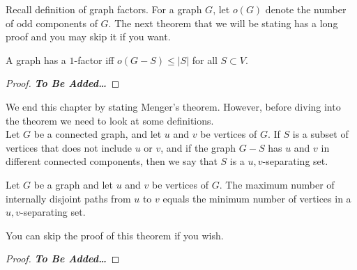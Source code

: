 \documentclass[../basic_graph_theory.tex]{subfiles}
\begin{document}
Recall definition of graph factors.  For a graph $G$, let $o(G)$ denote the number of odd components of $G$. The next theorem that we will be stating has a long proof and you may skip it if you want.
%
\begin{thm}
A graph has a $1$-factor iff $o(G-S) \leq |S|$ for all $S \subset V$.
\end{thm}
\begin{proof}
    \textbf{\textit{To Be Added\dots}}
\end{proof}
We end this chapter by stating Menger's theorem. However, before diving into the theorem we need to look at some definitions.\\
Let $G$ be a connected graph, and let $u$ and $v$ be vertices of $G$. If $S$ is a subset of vertices that does not include $u$ or $v$, and if the graph $G-S$ has $u$ and $v$ in different connected components, then we say that $S$ is a $u,v$-separating set.\\
\begin{thm}
    Let $G$ be a graph and let $u$ and $v$ be vertices of $G$. The maximum number of internally disjoint paths from $u$ to $v$ equals the minimum number of vertices in a $u,v$-separating set.
\end{thm}
You can skip the proof of this theorem if you wish.
\begin{proof}
    \textbf{\textit{To Be Added\dots}}
\end{proof}
\end{document}
